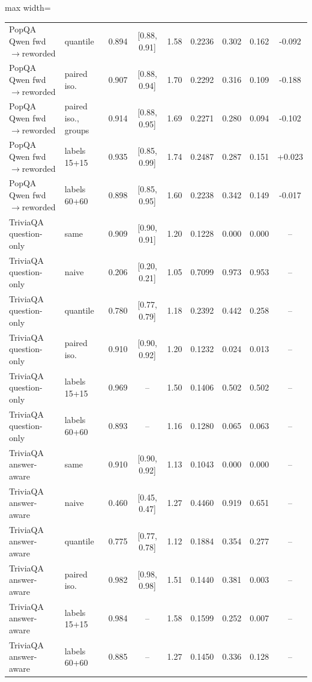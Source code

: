 \documentclass[twoside]{article}
\theoremstyle{definition}
\theoremstyle{remark}
\newcommand{\1}{\mathbf{1}}
\begin{document}
\begin{table}[t]
\begin{adjustbox}{max width=\textwidth}
\begin{tabular}{llccccccc}
PopQA Qwen fwd$\to$reworded & quantile & 0.894 & [0.88, 0.91] & 1.58 & 0.2236 & 0.302 & 0.162 & -0.092\\
PopQA Qwen fwd$\to$reworded & paired iso. & 0.907 & [0.88, 0.94] & 1.70 & 0.2292 & 0.316 & 0.109 & -0.188\\
PopQA Qwen fwd$\to$reworded & paired iso., groups & 0.914 & [0.88, 0.95] & 1.69 & 0.2271 & 0.280 & 0.094 & -0.102\\
PopQA Qwen fwd$\to$reworded & labels 15+15 & 0.935 & [0.85, 0.99] & 1.74 & 0.2487 & 0.287 & 0.151 & +0.023\\
PopQA Qwen fwd$\to$reworded & labels 60+60 & 0.898 & [0.85, 0.95] & 1.60 & 0.2238 & 0.342 & 0.149 & -0.017\\
\midrule
TriviaQA question-only & same & 0.909 & [0.90, 0.91] & 1.20 & 0.1228 & 0.000 & 0.000 & --\\
TriviaQA question-only & naive & 0.206 & [0.20, 0.21] & 1.05 & 0.7099 & 0.973 & 0.953 & --\\
TriviaQA question-only & quantile & 0.780 & [0.77, 0.79] & 1.18 & 0.2392 & 0.442 & 0.258 & --\\
TriviaQA question-only & paired iso. & 0.910 & [0.90, 0.92] & 1.20 & 0.1232 & 0.024 & 0.013 & --\\
TriviaQA question-only & labels 15+15 & 0.969 & -- & 1.50 & 0.1406 & 0.502 & 0.502 & --\\
TriviaQA question-only & labels 60+60 & 0.893 & -- & 1.16 & 0.1280 & 0.065 & 0.063 & --\\
\midrule
TriviaQA answer-aware & same & 0.910 & [0.90, 0.92] & 1.13 & 0.1043 & 0.000 & 0.000 & --\\
TriviaQA answer-aware & naive & 0.460 & [0.45, 0.47] & 1.27 & 0.4460 & 0.919 & 0.651 & --\\
TriviaQA answer-aware & quantile & 0.775 & [0.77, 0.78] & 1.12 & 0.1884 & 0.354 & 0.277 & --\\
TriviaQA answer-aware & paired iso. & 0.982 & [0.98, 0.98] & 1.51 & 0.1440 & 0.381 & 0.003 & --\\
TriviaQA answer-aware & labels 15+15 & 0.984 & -- & 1.58 & 0.1599 & 0.252 & 0.007 & --\\
TriviaQA answer-aware & labels 60+60 & 0.885 & -- & 1.27 & 0.1450 & 0.336 & 0.128 & --\\
\bottomrule
\end{tabular}
\end{adjustbox}
\end{table}
\end{document}
